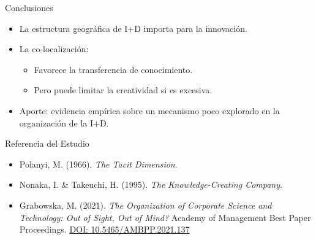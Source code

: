 \documentclass{beamer}
\begin{document}
	\begin{frame}{Conclusiones}
		\begin{itemize}
			\item La estructura geográfica de I+D importa para la innovación.
			\item La co-localización:
			\begin{itemize}
				\item Favorece la transferencia de conocimiento.
				\item Pero puede limitar la creatividad si es excesiva.
			\end{itemize}
			\item Aporte: evidencia empírica sobre un mecanismo poco explorado en la organización de la I+D.
		\end{itemize}
	\end{frame}
	
	\begin{frame}{Referencia del Estudio}
		\begin{itemize}
			\item[\faBook] Polanyi, M. (1966). \textit{The Tacit Dimension}.
			\item[\faBookOpen] Nonaka, I. \& Takeuchi, H. (1995). \textit{The Knowledge-Creating Company}.
			\item[\faBookReader] Grabowska, M. (2021). \emph{The Organization of Corporate Science and Technology: Out of Sight, Out of Mind?} Academy of Management Best Paper Proceedings. \href{https://doi.org/10.5465/AMBPP.2021.137}{DOI: 10.5465/AMBPP.2021.137}
		\end{itemize}
	\end{frame}
	
\end{document}
